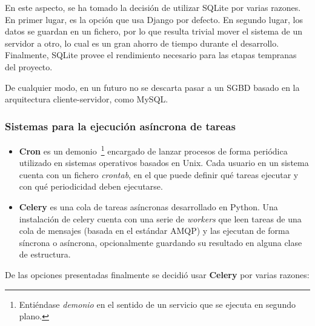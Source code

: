 En este aspecto, se ha tomado la decisión de utilizar SQLite por varias
razones. En primer lugar, es la opción que usa Django por defecto. En segundo
lugar, los datos se guardan en un fichero, por lo que resulta trivial mover el
sistema de un servidor a otro, lo cual es un gran ahorro de tiempo durante el
desarrollo. Finalmente, SQLite provee el rendimiento necesario para las etapas
tempranas del proyecto.

De cualquier modo, en un futuro no se descarta pasar a un SGBD basado en la
arquitectura cliente-servidor, como MySQL.

\subsubsection{Sistemas para la ejecución asíncrona de tareas}

\begin{itemize}
\item \textbf{Cron} es un demonio~\footnote{Entiéndase \textit{demonio} en el
    sentido de un servicio que se ejecuta en segundo plano.} encargado de lanzar
  procesos de forma periódica utilizado en sistemas operativos basados en
  Unix. Cada usuario en un sistema cuenta con un fichero \textit{crontab}, en el
  que puede definir qué tareas ejecutar y con qué periodicidad deben ejecutarse. 

\item \textbf{Celery} es una cola de tareas asíncronas desarrollado en
  Python. Una instalación de celery cuenta con una serie de \textit{workers} que
  leen tareas de una cola de mensajes (basada en el estándar \ac{AMQP}) y las
  ejecutan de forma síncrona o asíncrona, opcionalmente guardando su resultado
  en alguna clase de estructura. 

\end{itemize}

De las opciones presentadas finalmente se decidió usar \textbf{Celery} por
varias razones:

